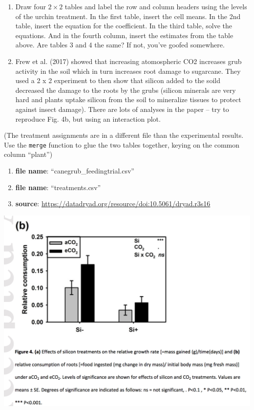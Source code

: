 \documentclass[]{book}
\providecommand{\tightlist}{%
  \setlength{\itemsep}{0pt}\setlength{\parskip}{0pt}}
\begin{document}
\begin{enumerate}
\def\labelenumi{\arabic{enumi}.}
\item
  Draw four \(2 \times 2\) tables and label the row and column headers
  using the levels of the urchin treatment. In the first table, insert
  the cell means. In the 2nd table, insert the equation for the
  coefficient. In the third table, solve the equations. And in the
  fourth column, insert the estimates from the table above. Are tables 3
  and 4 the same? If not, you've goofed somewhere.
\item
  Frew et al. (2017) showed that increasing atomospheric CO2 increases
  grub activity in the soil which in turn increases root damage to
  sugarcane. They used a 2 x 2 experiment to then show that silicon
  added to the soild decreased the damage to the roots by the grubs
  (silicon minerals are very hard and plants uptake silicon from the
  soil to mineralize tissues to protect against insect damage). There
  are lots of analyses in the paper -- try to reproduce Fig. 4b, but
  using an interaction plot.
\end{enumerate}

(The treatment assignments are in a different file than the experimental
results. Use the \texttt{merge} function to glue the two tables
together, keying on the common column ``plant'')

\begin{enumerate}
\def\labelenumi{\arabic{enumi}.}
\tightlist
\item
  \textbf{file name}: ``canegrub\_feedingtrial.csv''
\item
  \textbf{file name}: ``treatments.csv''
\item
  \textbf{source}:
  \url{https://datadryad.org/resource/doi:10.5061/dryad.r3s16}
\end{enumerate}

\includegraphics{images/frew_fig_4b.png}
\end{document}
